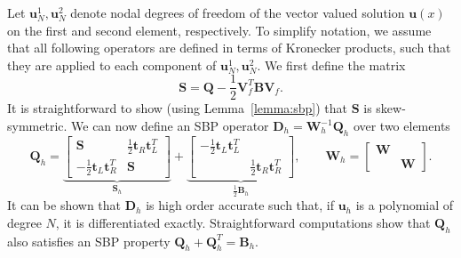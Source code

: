\documentclass[review,onefignum,onetabnum,final]{siamart171218}
\begin{document}
Let $\bm{u}^1_N, \bm{u}^2_N$ denote nodal degrees of freedom of the vector valued solution $\bm{u}(x)$ on the first and second element, respectively.  To simplify notation, we assume that all following operators are defined in terms of Kronecker products, such that they are applied to each component of $\bm{u}^1_N, \bm{u}^2_N$.  
We first define the matrix 
\begin{equation}
\bm{S} = \bm{Q} - \frac{1}{2}\bm{V}_f^T\bm{B}\bm{V}_f.
\label{eq:Smat}
\end{equation}
It is straightforward to show (using Lemma~\ref{lemma:sbp}) that $\bm{S}$ is skew-symmetric.  We can now define an SBP operator $\bm{D}_h = \bm{W}_h^{-1}\bm{Q}_h$ over two elements
\begin{equation}
\bm{Q}_{h} = 
\underbrace{\begin{bmatrix}
\bm{S}  & \frac{1}{2}\bm{t}_R\bm{t}_L^T \\
- \frac{1}{2}\bm{t}_L\bm{t}_R^T & \bm{S}
\end{bmatrix}}_{\bm{S}_h}
+
\underbrace{\begin{bmatrix}
-\frac{1}{2}\bm{t}_L\bm{t}_L^T  & \\
 & \frac{1}{2} \bm{t}_R\bm{t}_R^T
\end{bmatrix}}_{\frac{1}{2}\bm{B}_h}
, \qquad 
\bm{W}_h = \begin{bmatrix}\bm{W} &\\
& \bm{W}
\end{bmatrix}.
\label{eq:gsbp}
\end{equation}
It can be shown that $\bm{D}_h$ is high order accurate such that, if $\bm{u}_h$ is a polynomial of degree $N$, it is differentiated exactly.  Straightforward computations show that $\bm{Q}_h$ also satisfies an SBP property $\bm{Q}_h + \bm{Q}_h^T = \bm{B}_h$.
\end{document}
